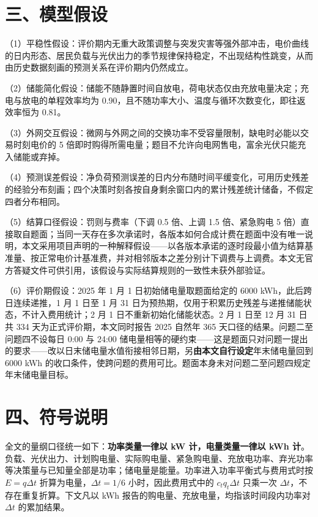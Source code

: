 \documentclass[12pt,a4paper]{ctexart}
\begin{document}
\section*{三、模型假设}

（1）平稳性假设：评价期内无重大政策调整与突发灾害等强外部冲击，电价曲线的日内形态、居民负载与光伏出力的季节规律保持稳定，不出现结构性跳变，从而由历史数据刻画的预测关系在评价期内仍然成立。

（2）储能简化假设：储能不随静置时间自放电，荷电状态仅由充放电量决定；充电与放电的单程效率均为 0.90，且不随功率大小、温度与循环次数变化，即往返效率恒为 0.81。

（3）外网交互假设：微网与外网之间的交换功率不受容量限制，缺电时必能以交易时刻电价的 5 倍即时购得所需电量；题目不允许向电网售电，富余光伏只能充入储能或弃掉。

（4）预测误差假设：净负荷预测误差的日内分布随时间平缓变化，可用历史残差的经验分布刻画；四个决策时刻各按自身剩余窗口内的累计残差统计储备，不假定四者分布相同。

（5）结算口径假设：罚则与费率（下调 0.5 倍、上调 1.5 倍、紧急购电 5 倍）直接取自题面；当同一天存在多次承诺时，各版本如何合成计费在题面中没有唯一说明，本文采用项目声明的一种解释假设——以各版本承诺的逐时段最小值为结算基准量、按正常电价计基准费，并对相邻版本之差分别计下调费与上调费。本文无官方答疑文件可供引用，该假设与实际结算规则的一致性未获外部验证。

（6）评价期假设：2025 年 1 月 1 日初始储电量取题面给定的 6000 kWh，此后跨日连续递推，1 月 1 日至 1 月 31 日为预热期，仅用于积累历史残差与递推储能状态，不计入费用统计；2 月 1 日不重新初始化储能状态。2 月 1 日至 12 月 31 日共 334 天为正式评价期，本文同时报告 2025 自然年 365 天口径的结果。问题二至问题四不设每日 0:00 与 24:00 储电量相等的硬约束——这是题面只对问题一提出的要求——改以日末储电量水值衔接相邻日期，另\textbf{由本文自行设定}年末储电量回到 6000 kWh 的收口条件，使跨问题的费用可比。题面本身未对问题二至问题四规定年末储电量目标。

\section*{四、符号说明}

全文的量纲口径统一如下：\textbf{功率类量一律以 kW 计，电量类量一律以 kWh 计}。负载、光伏出力、计划购电量、实际购电量、紧急购电量、充放电功率、弃光功率等决策量与已知量全部是功率；储电量是能量。功率进入功率平衡式与费用式时按 $E=q\Delta t$ 折算为电量，$\Delta t=1/6$ 小时，因此费用式中的 $c_t q_t\Delta t$ 只乘一次 $\Delta t$，不存在重复折算。下文凡以 kWh 报告的购电量、充放电量，均指该时间段内功率对 $\Delta t$ 的累加结果。
\end{document}
